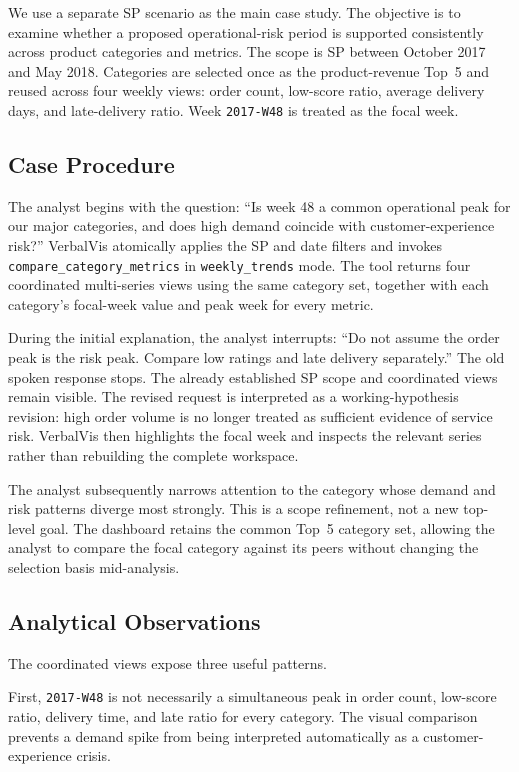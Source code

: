 \documentclass[journal]{IEEEtran}
\begin{document}
We use a separate SP scenario as the main case study. The objective is to examine whether a proposed operational-risk period is supported consistently across product categories and metrics. The scope is SP between October 2017 and May 2018. Categories are selected once as the product-revenue Top~5 and reused across four weekly views: order count, low-score ratio, average delivery days, and late-delivery ratio. Week \texttt{2017-W48} is treated as the focal week.

\subsection{Case Procedure}

The analyst begins with the question: ``Is week 48 a common operational peak for our major categories, and does high demand coincide with customer-experience risk?'' VerbalVis atomically applies the SP and date filters and invokes \texttt{compare\_category\_metrics} in \texttt{weekly\_trends} mode. The tool returns four coordinated multi-series views using the same category set, together with each category's focal-week value and peak week for every metric.

During the initial explanation, the analyst interrupts: ``Do not assume the order peak is the risk peak. Compare low ratings and late delivery separately.'' The old spoken response stops. The already established SP scope and coordinated views remain visible. The revised request is interpreted as a working-hypothesis revision: high order volume is no longer treated as sufficient evidence of service risk. VerbalVis then highlights the focal week and inspects the relevant series rather than rebuilding the complete workspace.

The analyst subsequently narrows attention to the category whose demand and risk patterns diverge most strongly. This is a scope refinement, not a new top-level goal. The dashboard retains the common Top~5 category set, allowing the analyst to compare the focal category against its peers without changing the selection basis mid-analysis.

\subsection{Analytical Observations}

The coordinated views expose three useful patterns.

First, \texttt{2017-W48} is not necessarily a simultaneous peak in order count, low-score ratio, delivery time, and late ratio for every category. The visual comparison prevents a demand spike from being interpreted automatically as a customer-experience crisis.
\end{document}
